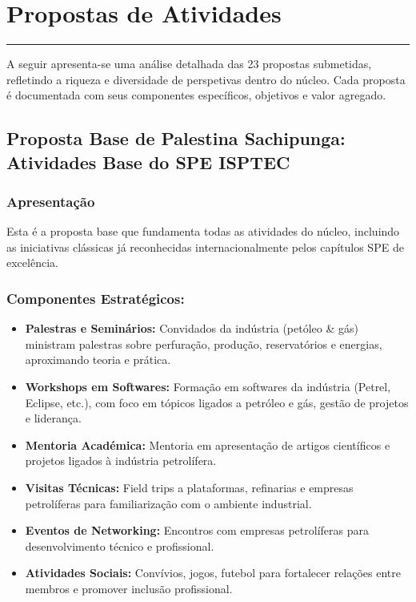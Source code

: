 \documentclass[12pt,a4paper]{article}
\begin{document}
\clearpage
\section{Propostas de Atividades}
\textcolor{spe-secondary}{\rule{\linewidth}{0.5pt}}

A seguir apresenta-se uma análise detalhada das 23 propostas submetidas, refletindo a riqueza e diversidade de perspetivas dentro do núcleo. Cada proposta é documentada com seus componentes específicos, objetivos e valor agregado.

\subsection{Proposta Base de Palestina Sachipunga: Atividades Base do SPE ISPTEC}

\subsubsection*{Apresentação}
Esta é a proposta base que fundamenta todas as atividades do núcleo, incluindo as iniciativas clássicas já reconhecidas internacionalmente pelos capítulos SPE de excelência.

\subsubsection*{Componentes Estratégicos:}

\begin{itemize}[itemsep=0.2cm]
    \item \textbf{Palestras e Seminários:} Convidados da indústria (petóleo \& gás) ministram palestras sobre perfuração, produção, reservatórios e energias, aproximando teoria e prática.
    
    \item \textbf{Workshops em Softwares:} Formação em softwares da indústria (Petrel, Eclipse, etc.), com foco em tópicos ligados a petróleo e gás, gestão de projetos e liderança.
    
    \item \textbf{Mentoria Académica:} Mentoria em apresentação de artigos científicos e projetos ligados à indústria petrolífera.
    
    \item \textbf{Visitas Técnicas:} Field trips a plataformas, refinarias e empresas petrolíferas para familiarização com o ambiente industrial.
    
    \item \textbf{Eventos de Networking:} Encontros com empresas petrolíferas para desenvolvimento técnico e profissional.
    
    \item \textbf{Atividades Sociais:} Convívios, jogos, futebol para fortalecer relações entre membros e promover inclusão profissional.
\end{itemize}
\end{document}

